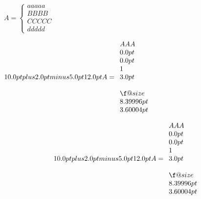 \ifLuaTeX
  \usepackage{selnolig}  %
\fi
{}



\newpage



$A=\left\{\begin{array}{l}aaaaa\\BBBB\\CCCCC\\ddddd\end{array}\right.$


\setlength{\jot}{0pt}
\lineskip=0pt
\lineskiplimit=0pt
\renewcommand{\arraystretch}{1}

\abovedisplayskip=0pt



\makeatletter
$\baselinestretch \the\abovedisplayskip \the\baselineskip A=\begin{array}{l}AAA\\ \the\baselineskip \\ \the\lineskip \\ \arraystretch \\
                   \the\jot \\ \baselinestretch \\
                   \f@size \\
                   \the\ht\strutbox \\ \the\dp\strutbox \end{array}$

$$\baselinestretch \the\abovedisplayskip \the\baselineskip A=\begin{array}{l}AAA\\ \the\baselineskip \\ \the\lineskip \\ \arraystretch \\
                   \the\jot \\ \baselinestretch \\
                   \f@size \\
                   \the\ht\strutbox \\ \the\dp\strutbox \end{array}$$

